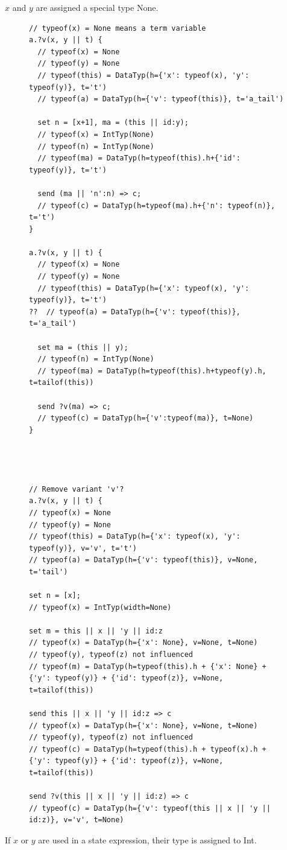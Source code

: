 $x$ and $y$ are assigned a special type None.
\begin{figure}[h!]
\begin{lstlisting}
// typeof(x) = None means a term variable
a.?v(x, y || t) {
  // typeof(x) = None
  // typeof(y) = None
  // typeof(this) = DataTyp(h={'x': typeof(x), 'y': typeof(y)}, t='t')
  // typeof(a) = DataTyp(h={'v': typeof(this)}, t='a_tail')

  set n = [x+1], ma = (this || id:y);
  // typeof(x) = IntTyp(None)
  // typeof(n) = IntTyp(None)
  // typeof(ma) = DataTyp(h=typeof(this).h+{'id': typeof(y)}, t='t')

  send (ma || 'n':n) => c;
  // typeof(c) = DataTyp(h=typeof(ma).h+{'n': typeof(n)}, t='t')
}

a.?v(x, y || t) {
  // typeof(x) = None
  // typeof(y) = None
  // typeof(this) = DataTyp(h={'x': typeof(x), 'y': typeof(y)}, t='t')
??  // typeof(a) = DataTyp(h={'v': typeof(this)}, t='a_tail')

  set ma = (this || y);
  // typeof(n) = IntTyp(None)
  // typeof(ma) = DataTyp(h=typeof(this).h+typeof(y).h, t=tailof(this))

  send ?v(ma) => c;
  // typeof(c) = DataTyp(h={'v':typeof(ma)}, t=None)
}




// Remove variant 'v'?
a.?v(x, y || t) {
// typeof(x) = None
// typeof(y) = None
// typeof(this) = DataTyp(h={'x': typeof(x), 'y': typeof(y)}, v='v', t='t')
// typeof(a) = DataTyp(h={'v': typeof(this)}, v=None, t='tail')

set n = [x];
// typeof(x) = IntTyp(width=None)

set m = this || x || 'y || id:z
// typeof(x) = DataTyp(h={'x': None}, v=None, t=None)
// typeof(y), typeof(z) not influenced
// typeof(m) = DataTyp(h=typeof(this).h + {'x': None} + {'y': typeof(y)} + {'id': typeof(z)}, v=None, t=tailof(this))

send this || x || 'y || id:z => c
// typeof(x) = DataTyp(h={'x': None}, v=None, t=None)
// typeof(y), typeof(z) not influenced
// typeof(c) = DataTyp(h=typeof(this).h + typeof(x).h + {'y': typeof(y)} + {'id': typeof(z)}, v=None, t=tailof(this))

send ?v(this || x || 'y || id:z) => c
// typeof(c) = DataTyp(h={'v': typeof(this || x || 'y || id:z)}, v='v', t=None)

\end{lstlisting}
\label{aa}
\end{figure}

If $x$ or $y$ are used in a state expression, their type is assigned to Int.


